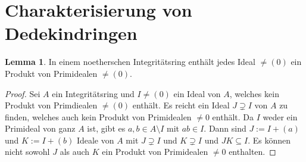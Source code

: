 \documentclass[
twoside=semi,
fontsize=12,
DIV=12, 
cleardoublepage=current,
leqno,
headings=optiontoheadandtoc, 
toc=idx
]{scrbook}
\theoremstyle{definition}
\newtheorem{lemma}[definition]{Lemma}
\begin{document}
 	\section{Charakterisierung von Dedekindringen}\thispagestyle{sectionstart}
 	\begin{lemma}\label{2.3.1}
 		In einem noetherschen Integrit\"atsring enth\"alt jedes Ideal $\neq (0)$ ein Produkt von Primidealen $\neq (0)$.
 			
 		\begin{proof}
 			Sei $A$ ein Integrit\"atsring und $I \neq (0)$ ein Ideal von $A$, welches kein Produkt von Primdiealen $\neq (0)$ enth\"alt. Es reicht ein Ideal $J \supsetneq I$ von $A$ zu finden, welches auch kein Produkt von Primidealen $\neq 0$ enth\"alt. Da $I$ weder ein Primideal von ganz $A$ ist, gibt es $a,b \in A\setminus I$ mit $ab \in I$. Dann sind $J := I + (a)$ und $K:= I+(b)$ Ideale von $A$ mit $J \supsetneq I$ und $K \supsetneq I$ und $JK \subseteq I$. Es k\"onnen nicht sowohl $J$ als auch $K$ ein Produkt von Primidealen $\neq 0$ enthalten.
 		\end{proof} 
 	\end{lemma}
   	
\end{document}
